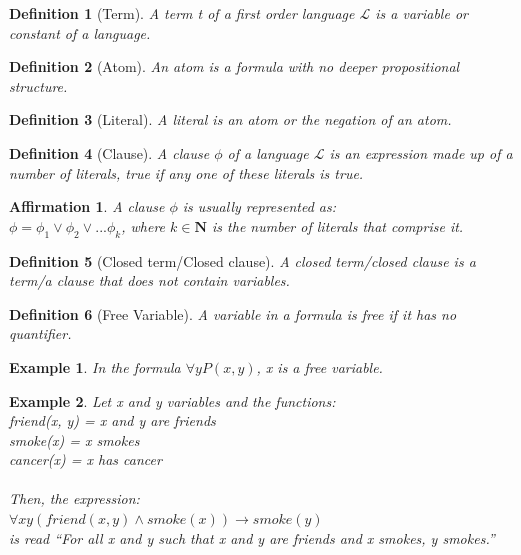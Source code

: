 \documentclass{article}
\newtheorem{definition}{Definition}[section]
\newtheorem{prop}{Affirmation}[section]
\newtheorem{example}{Example}[section]
\begin{document}
\begin{definition}[Term]
A term t of a first order language $\mathcal{L}$ is a variable or constant of a language. \cite{FOL}
\end{definition}

\begin{definition}[Atom]
An atom is a formula with no deeper propositional structure. \cite{Atomic_Formula}
\end{definition}

\begin{definition}[Literal]
A literal is an atom or the negation of an atom. \cite{Literal}
\end{definition}

\begin{definition}[Clause]
A clause $\phi$ of a language $\mathcal{L}$ is an expression made up of a number of literals, true if any one of these literals is true. \cite{Clause}
\end{definition}

\begin{prop}
A clause $\phi$ is usually represented as:\\
	$\phi = \phi_1 \vee \phi_2 \vee ... \phi_k$, where $k \in \mathbf{N}$ is the number of literals that comprise it. \cite{Clause}
\end{prop}

\begin{definition}[Closed term/Closed clause]
A closed term/closed clause is a term/a clause that does not contain variables. \cite{Closed_Term}
\end{definition}

\begin{definition}[Free Variable]
A variable in a formula is free if it has no quantifier. \cite{Free_Variable}
\end{definition}

\begin{example}
In the formula $\forall yP(x, y)$, x is a free variable.\cite{Free_Variable}
\end{example}

\begin{example}
Let x and y variables and the functions:\\
friend(x, y) = x and y are friends\\
smoke(x) = x smokes\\
cancer(x) = x has cancer\\ \\
Then, the expression:\\
$\forall xy(friend(x,y) \land smoke(x)) \rightarrow smoke(y)$ \\
is read ``For all x and y such that x and y are friends and x smokes, y smokes.''
\end{example}
\end{document}
